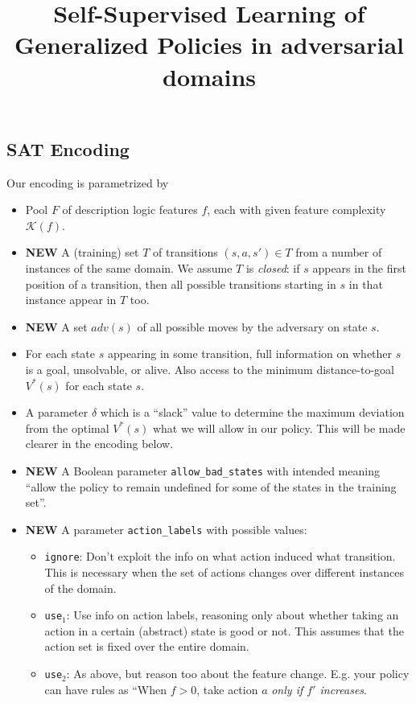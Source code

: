 \documentclass[a4paper]{article}
\title{Self-Supervised Learning of Generalized Policies in adversarial domains}
\newcommand{\newcontent}{\textbf{\color{red}NEW}}
\begin{document}
\maketitle


\subsection{SAT Encoding}

Our encoding is parametrized by
\begin{itemize}
 \item Pool $F$ of description logic features $f$, each with given feature complexity $\mathcal{K}(f)$.
 \item \newcontent{} A (training) set $T$ of transitions $(s, a, s') \in T$ from a number of instances of the same domain.
       We assume $T$ is \emph{closed}: if $s$ appears in the first position of a transition, then all possible
       transitions starting in $s$ in that instance appear in $T$ too.
 \item \newcontent{} A set $adv(s)$ of all possible moves by the adversary on state $s$.

 \item For each state $s$ appearing in some transition, full information on whether $s$
       is a goal, unsolvable, or alive.
       Also access to the minimum distance-to-goal $V^*(s)$ for each state $s$.
 \item A parameter $\delta$ which is a ``slack'' value to determine the maximum deviation from the optimal $V^*(s)$
 what we will allow in our policy. This will be made clearer in the encoding below.

 \item \newcontent{} A Boolean parameter \texttt{allow\_bad\_states} with intended meaning ``allow the policy
        to remain undefined for some of the states in the training set''.
 \item \newcontent{} A parameter \texttt{action\_labels} with possible values:
 \begin{itemize}
   \item \texttt{ignore}: Don't exploit the info on what action induced what transition. This is necessary
  when the set of actions changes over different instances of the domain.
   \item \texttt{use$_1$}: Use info on action labels, reasoning only about whether taking an action in a certain
   (abstract) state is good or not. This assumes that the action set is fixed over the entire domain.
   \item \texttt{use$_2$}: As above, but reason too about the feature change. E.g. your policy can have rules as
  ``When $f>0$, take action $a$ \emph{only if $f'$ increases}.
 \end{itemize}
\end{itemize}
\end{document}
